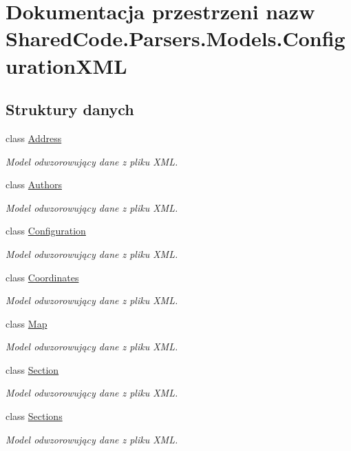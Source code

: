 \hypertarget{a00314}{}\section{Dokumentacja przestrzeni nazw Shared\+Code.\+Parsers.\+Models.\+Configuration\+X\+M\+L}
\label{a00314}
\subsection*{Struktury danych}
\begin{DoxyCompactItemize}
\item 
class \hyperlink{a00004}{Address}
\begin{DoxyCompactList}\small\item\em Model odwzorowujący dane z pliku X\+M\+L. \end{DoxyCompactList}\item 
class \hyperlink{a00007}{Authors}
\begin{DoxyCompactList}\small\item\em Model odwzorowujący dane z pliku X\+M\+L. \end{DoxyCompactList}\item 
class \hyperlink{a00011}{Configuration}
\begin{DoxyCompactList}\small\item\em Model odwzorowujący dane z pliku X\+M\+L. \end{DoxyCompactList}\item 
class \hyperlink{a00015}{Coordinates}
\begin{DoxyCompactList}\small\item\em Model odwzorowujący dane z pliku X\+M\+L. \end{DoxyCompactList}\item 
class \hyperlink{a00040}{Map}
\begin{DoxyCompactList}\small\item\em Model odwzorowujący dane z pliku X\+M\+L. \end{DoxyCompactList}\item 
class \hyperlink{a00053}{Section}
\begin{DoxyCompactList}\small\item\em Model odwzorowujący dane z pliku X\+M\+L. \end{DoxyCompactList}\item 
class \hyperlink{a00054}{Sections}
\begin{DoxyCompactList}\small\item\em Model odwzorowujący dane z pliku X\+M\+L. \end{DoxyCompactList}\item 

\end{DoxyCompactItemize}
